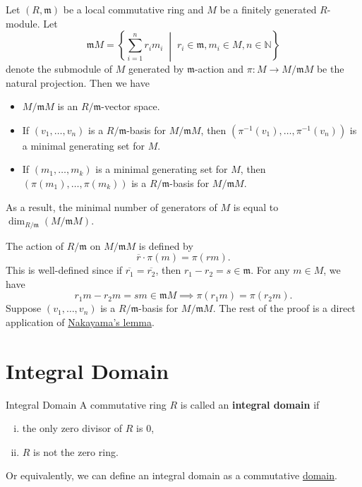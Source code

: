 \begin{proposition}{}{}
    Let $(R, \mathfrak{m})$ be a local commutative ring and $M$ be a finitely generated $R$-module. Let
    \[
\mathfrak{m}M = \left\{ \sum_{i=1}^n r_i m_i \;\middle|\; r_i \in \mathfrak{m}, m_i \in M, n \in \mathbb{N} \right\}
\]
denote the submodule of $M$ generated by $\mathfrak{m}$-action and $\pi: M \to M/\mathfrak{m}M$ be the natural projection. Then we have
\begin{itemize}
    \item $M/\mathfrak{m}M$ is an $R/\mathfrak{m}$-vector space. 
    \item If $(v_1, \ldots, v_n)$ is a $R/\mathfrak{m}$-basis for $M/\mathfrak{m}M$, then $(\pi^{-1}(v_1), \ldots, \pi^{-1}(v_n))$ is a minimal generating set for $M$.
    \item If $(m_1, \ldots, m_k)$ is a minimal generating set for $M$, then $(\pi(m_1), \ldots, \pi(m_k))$ is a $R/\mathfrak{m}$-basis for $M/\mathfrak{m}M$.
\end{itemize}
As a result, the minimal number of generators of $M$ is equal to $\dim_{R/\mathfrak{m}}(M/\mathfrak{m}M)$.
\end{proposition}
\begin{prf}
   The action of $R/\mathfrak{m}$ on $M/\mathfrak{m}M$ is defined by
    \[
        \overline{r}\cdot\pi(m)=\pi(rm).
    \]
   This is well-defined since if $\overline{r_1}=\overline{r_2}$, then $r_1-r_2=s \in \mathfrak{m}$. For any $m\in M$, we have
    \[
         r_1m-r_2m=sm\in \mathfrak{m}M \implies \pi(r_1m)=\pi(r_2m).
    \]
    Suppose $(v_1, \ldots, v_n)$ is a $R/\mathfrak{m}$-basis for $M/\mathfrak{m}M$. The rest of the proof is a direct application of \hyperlink{th:Nakayama_lemma}{Nakayama's lemma}.
\end{prf}


\section{Integral Domain}

\begin{definition}{Integral Domain}{}
    A commutative ring $R$ is called an \textbf{integral domain} if
    \begin{enumerate}[(i)]
        \item the only zero divisor of $R$ is 0,
        \item $R$ is not the zero ring.
    \end{enumerate}
\end{definition}
\begin{remark}
    Or equivalently, we can define an integral domain as a commutative \hyperref[th:domain]{domain}.
\end{remark}

